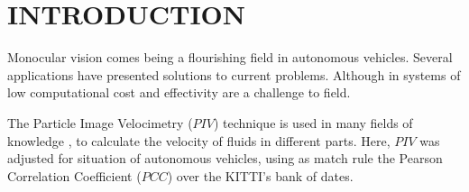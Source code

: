 \section{INTRODUCTION}

Monocular vision comes being a flourishing field in autonomous vehicles. 
Several applications have presented solutions to current problems. 
Although in systems  of low computational cost  and effectivity are a challenge to field. 


The Particle Image Velocimetry ($PIV$)\cite{Bastiaans} technique is used in many fields of 
knowledge \cite{Story, Xu}, to calculate the velocity of fluids in different parts. 
Here, $PIV$ was adjusted for situation of autonomous vehicles, using as match rule 
the Pearson Correlation Coefficient ($PCC$)\cite{Miranda Neto} over the KITTI's 
bank of dates\cite{Geiger}.


